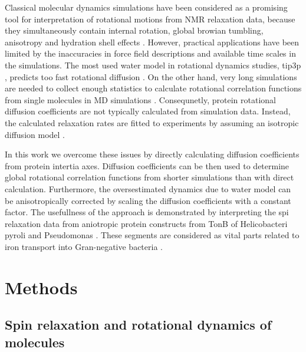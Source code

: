 \documentclass[pre,aps,floatfix,authordate1-4,twocolumn]{revtex4-1}
\begin{document}
Classical molecular dynamics simulations have been considered as a
promising tool for interpretation of rotational motions from NMR
relaxation data, because they simultaneously contain internal rotation,
global browian tumbling, anisotropy and hydration shell effects \cite{??}.
However, practical applications have been limited by the inaccuracies
in force field descriptions and available time scales in the simulations.
The most used water model in rotational dynamics studies, tip3p \cite{??},
predicts too fast rotational diffusion \cite{??}. On the other hand, very long
simulations are needed to collect enough statistics to calculate rotational
correlation functions from single molecules in MD simulations \cite{??}.
Consequnetly, protein rotational diffusion coefficients are not typically
calculated from simulation data. Instead, the calculated relaxation rates
are fitted to experiments by assuming an isotropic diffusion model \cite{??}.

In this work we overcome these issues by directly calculating diffusion
coefficients from protein intertia axes. Diffusion coefficients can be then
used to determine global rotational correlation functions from shorter simulations
than with direct calculation. Furthermore, the oversestimated dynamics due to water model
can be anisotropically corrected by scaling the diffusion coefficients with a constant
factor. The usefullness of the approach is demonstrated by interpreting the
spi relaxation data from aniotropic protein constructs from TonB
of Helicobacteri pyroli \cite{??} and Pseudomonas \cite{??}.
These segments are considered as vital parts related to iron transport
into Gran-negative bacteria \cite{??}.


\section{Methods}

\subsection{Spin relaxation and rotational dynamics of molecules}
\end{document}
